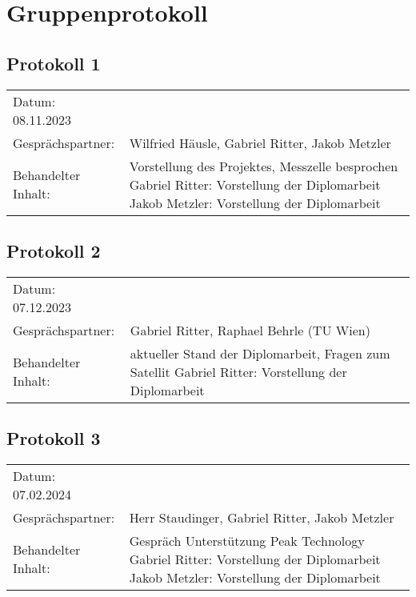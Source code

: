 \chapter{Gruppenprotokoll}

\section*{Protokoll 1}

\begin{tabular}{p{} p{}}
	Datum: 08.11.2023 \\
	Gesprächspartner: & Wilfried Häusle, Gabriel Ritter, Jakob Metzler \\
	Behandelter Inhalt: & Vorstellung des Projektes, Messzelle besprochen \newline
	Gabriel Ritter: Vorstellung der Diplomarbeit \newline
	Jakob Metzler: Vorstellung der Diplomarbeit \newline
\end{tabular}

\section*{Protokoll 2}
\begin{tabular}{p{} p{}}
	Datum: 07.12.2023 \\
	Gesprächspartner: & Gabriel Ritter, Raphael Behrle (TU Wien) \\
	Behandelter Inhalt: & aktueller Stand der Diplomarbeit, Fragen zum Satellit \newline
	Gabriel Ritter: Vorstellung der Diplomarbeit \newline
\end{tabular}

\section*{Protokoll 3}

\begin{tabular}{p{} p{}}
	Datum: 07.02.2024 \\
	Gesprächspartner: & Herr Staudinger, Gabriel Ritter, Jakob Metzler \\
	Behandelter Inhalt: & Gespräch Unterstützung Peak Technology \newline
	Gabriel Ritter: Vorstellung der Diplomarbeit \newline
	Jakob Metzler: Vorstellung der Diplomarbeit \newline
\end{tabular}
